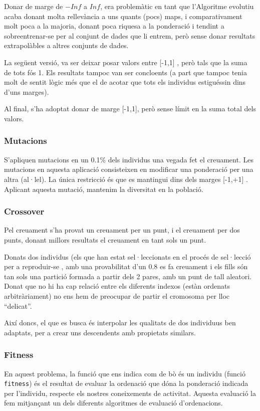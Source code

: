 \documentclass[titlepage,a4paper,12pt]{book}
\begin{document}
Donar de marge de $-Inf$ a $Inf$, era problemàtic en tant que l'Algoritme
evolutiu acaba donant molta rellevància a uns quants (pocs) maps, i
comparativament molt poca a la majoria, donant poca riquesa a la ponderació i
tendint a sobreentrenar-se per al conjunt de dades que li entrem, però sense
donar resultats extrapolàbles a altres conjunts de dades.

La següent versió, va ser deixar posar valors entre [-1,1] , però tals que la
suma de tots fós 1.  Els resultats tampoc van ser concloents (a part que tampoc
tenia molt de sentit lògic més que el de acotar que tots els individus
estiguéssin dins d'uns marges).

Al final, s'ha adoptat donar de marge [-1,1], però sense límit en la suma total
dels valors.


\subsubsection{Mutacions} %
\label{ssub:Mutacions}

S'apliquen mutacions en un 0.1\% dels individus una vegada fet el creuament.
Les mutacions en aquesta aplicació consisteixen en modificar una ponderació per
una altra (al·lel).  La única restricció és que es mantingui dins dels marges
[-1,+1] .  Aplicant aquesta mutació, mantenim la diversitat en la població.

\subsubsection{Crossover} %
\label{ssub:Crossover}
Pel creuament s'ha provat un creuament per un punt, i el creuament per dos punts, donant millors
resultats el creuament en tant sols un punt.  

Donats dos individus (els que han estat sel·leccionats en el procés de
sel·lecció per a reproduir-se , amb una provabilitat d'un 0.8 es fa creuament i
els fills són tan sols una partició formada a partir dels 2 pares, amb un punt
de tall aleatori.  Donat que no hi ha cap relació entre els diferents indexos
(estàn ordenats arbitràriament) no ens hem de preocupar de partir el cromosoma
per lloc ``delicat''. 

Així doncs, el que es busca és interpolar les qualitats de dos individuus ben
adaptats, per a crear uns descendents amb propietats similars.


\subsubsection{Fitness} %
\label{ssub:Fitness}
En aquest problema, la funció que ens indica com de bò és un individu (funció
\texttt{fitness}) és el resultat de evaluar la ordenació que dóna la ponderació
indicada per l'individu, respecte els nostres coneixements de activitat. Aquesta
evaluació la fem mitjançant un dels diferents algoritmes de evaluació d'ordenacions.
\end{document}
